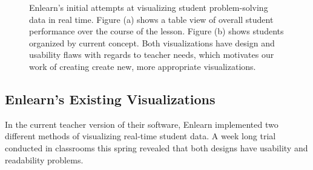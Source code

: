 \documentclass{sigchi}
\begin{document}
\begin{figure}[t]
\centering
{} \hspace{1em}%
 \hspace{1em}%
\caption{Enlearn's initial attempts at visualizing student problem-solving data in real time. Figure (a) shows a table view of overall student performance over the course of the lesson. Figure (b) shows students organized by current concept. Both visualizations have design and usability flaws with regards to teacher needs, which motivates our work of creating create new, more appropriate visualizations.}
\label{fig:Prior}
\end{figure}

\subsection{Enlearn's Existing Visualizations}

In the current teacher version of their software, Enlearn implemented two different methods of visualizing real-time student data. A week long trial conducted in classrooms this spring revealed that both designs have usability and readability problems. 
\end{document}
